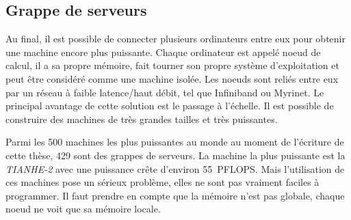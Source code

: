 \subsection{Grappe de serveurs}
Au final, il est possible de connecter plusieurs ordinateurs entre eux pour obtenir une machine encore plus puissante.
%
Chaque ordinateur est appelé noeud de calcul, il a sa propre mémoire, fait tourner son propre système d'exploitation et peut être considéré comme une machine isolée.
%
Les noeuds sont reliés entre eux par un réseau à faible latence/haut débit, tel que Infiniband ou Myrinet.
%
Le principal avantage de cette solution est le passage à l'échelle.
%
Il est possible de construire des machines de très grandes tailles et très puissantes.



Parmi les 500 machines les plus puissantes au monde au moment de l'écriture de cette thèse, 429 sont des grappes de serveurs.
%
La machine la plus puissante est la {\em TIANHE-2} avec une puissance crête d'environ 55~PFLOPS.
%
Mais l'utilisation de ces machines pose un sérieux problème, elles ne sont pas vraiment faciles à programmer.
%
Il faut prendre en compte que la mémoire n'est pas globale, chaque noeud ne voit que sa mémoire locale.
